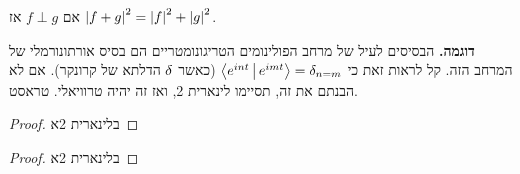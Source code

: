 \documentclass[]{../../../../tex/classes/styledArticle}
\begin{document}
	\begin{Collary}[פיתגורס]
		אם $f \perp g$ אז $\left \lvert f + g \right \rvert^{2} = \left \lvert f \right \rvert^{2} + \left \lvert g \right \rvert^{2}$. 
	\end{Collary}
	\textbf{דוגמה. }הבסיסים לעיל של מרחב הפולינומים הטריגונומטריים הם בסיס אורתונורמלי של המרחב הזה. קל לראות זאת כי $\left \langle e^{int} \,\middle|\, e^{imt} \right \rangle = \delta_{n = m}$ (כאשר $\delta$ הדלתא של קרונקר). אם לא הבנתם את זה, תסיימו לינארית 2, ואז זה יהיה טרוויאלי. טראסט. 
	
	\begin{proof}
		בלינארית 2א
	\end{proof}
	\begin{proof}
		בלינארית 2א
	\end{proof}
	
	
	\ndoc
\end{document}
